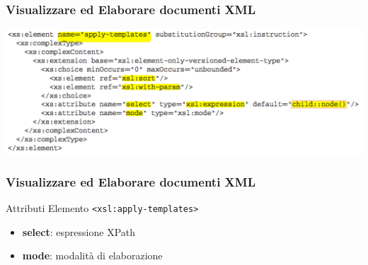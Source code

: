 \begin{frame}
    \frametitle{Visualizzare ed Elaborare documenti XML}
    \addtocounter{nframe}{1}
    
    \begin{center}
        \includegraphics[width=.95\textwidth]{imgs/Schema-apply-templates.png}
    \end{center}

\end{frame}

\begin{frame}
    \frametitle{Visualizzare ed Elaborare documenti XML}
    \addtocounter{nframe}{1}
    

     \begin{block}{Attributi Elemento \texttt{<xsl:apply-templates>}}
         \begin{itemize}
             \item \textbf{select}: espressione XPath
             \item \textbf{mode}: modalità di elaborazione
        \end{itemize}
     \end{block}
    
\end{frame}

